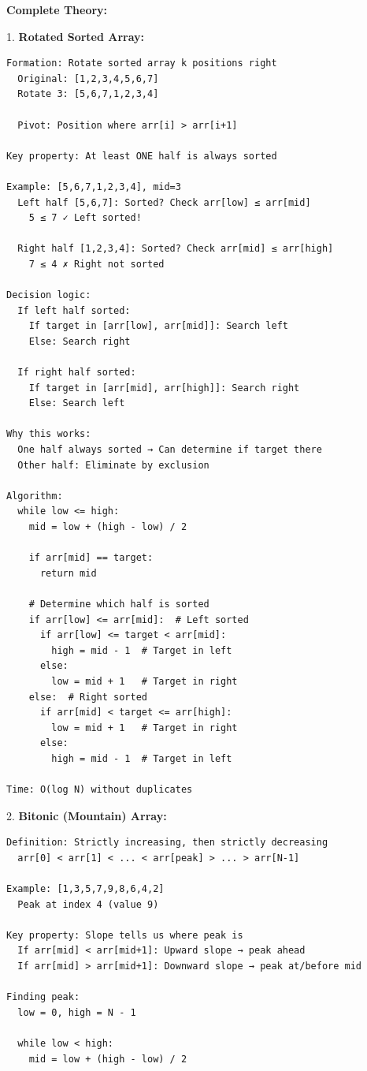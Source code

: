 \documentclass[11pt,a4paper,oneside]{book}
\begin{document}
\begin{tcolorbox}[
    enhanced,breakable,
    colback=white,
    colframe=deepblue,
    boxrule=1.5pt,
    arc=3mm,
    title=\textbf{Beyond Simple Sorted Arrays}
]
\textbf{Complete Theory:}

1. \textbf{Rotated Sorted Array:}
\begin{verbatim}
Formation: Rotate sorted array k positions right
  Original: [1,2,3,4,5,6,7]
  Rotate 3: [5,6,7,1,2,3,4]
  
  Pivot: Position where arr[i] > arr[i+1]

Key property: At least ONE half is always sorted
  
Example: [5,6,7,1,2,3,4], mid=3
  Left half [5,6,7]: Sorted? Check arr[low] ≤ arr[mid]
    5 ≤ 7 ✓ Left sorted!
  
  Right half [1,2,3,4]: Sorted? Check arr[mid] ≤ arr[high]
    7 ≤ 4 ✗ Right not sorted

Decision logic:
  If left half sorted:
    If target in [arr[low], arr[mid]]: Search left
    Else: Search right
  
  If right half sorted:
    If target in [arr[mid], arr[high]]: Search right
    Else: Search left

Why this works:
  One half always sorted → Can determine if target there
  Other half: Eliminate by exclusion

Algorithm:
  while low <= high:
    mid = low + (high - low) / 2
    
    if arr[mid] == target:
      return mid
    
    # Determine which half is sorted
    if arr[low] <= arr[mid]:  # Left sorted
      if arr[low] <= target < arr[mid]:
        high = mid - 1  # Target in left
      else:
        low = mid + 1   # Target in right
    else:  # Right sorted
      if arr[mid] < target <= arr[high]:
        low = mid + 1   # Target in right
      else:
        high = mid - 1  # Target in left

Time: O(log N) without duplicates
\end{verbatim}

2. \textbf{Bitonic (Mountain) Array:}
\begin{verbatim}
Definition: Strictly increasing, then strictly decreasing
  arr[0] < arr[1] < ... < arr[peak] > ... > arr[N-1]

Example: [1,3,5,7,9,8,6,4,2]
  Peak at index 4 (value 9)

Key property: Slope tells us where peak is
  If arr[mid] < arr[mid+1]: Upward slope → peak ahead
  If arr[mid] > arr[mid+1]: Downward slope → peak at/before mid

Finding peak:
  low = 0, high = N - 1
  
  while low < high:
    mid = low + (high - low) / 2
    

\end{verbatim}
\end{tcolorbox}
\end{document}
